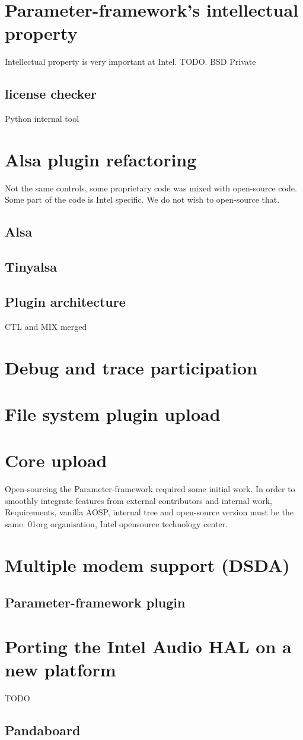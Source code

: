 \section{Parameter-framework's intellectual property}
Intellectual property is very important at Intel. TODO.
BSD
Private
\subsection{license checker}
Python internal tool

\section{Alsa plugin refactoring}
Not the same controls, some proprietary code was mixed with open-source code.
Some part of the code is Intel specific. We do not wish to open-source that.

\subsection{Alsa}
\subsection{Tinyalsa}
\subsection{Plugin architecture}
CTL and MIX merged

\section{Debug and trace participation}

\section{File system plugin upload}

\section{Core upload}
Open-sourcing the Parameter-framework required some initial work.
In order to smoothly integrate features from external contributors and internal work,
Requirements, vanilla AOSP, internal tree and open-source version must be the
same.
01org organisation, Intel opensource technology center.

\section{Multiple modem support (DSDA)}
\subsection{Parameter-framework plugin}

\section{Porting the Intel Audio HAL on a new platform}
TODO
\subsection{Pandaboard}

